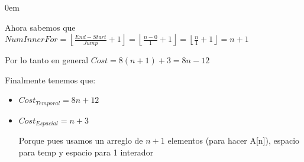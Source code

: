 \documentclass[12pt, fleqn]{article}                            %
\newenvironment{SmallIndentation}[1][0.75em]                    %
        {\begin{adjustwidth}{#1}{}\begin{footnotesize}}             %
        {\end{footnotesize}\end{adjustwidth}}                       %
\theoremstyle{break}                                            %
\newcommand{\Floor}[1]{\left \lfloor #1 \right \rfloor}         %
\begin{document}
\begin{SmallIndentation}[0em]
\begin{enumerate}
                Ahora sabemos que 
                $NumInnerFor 
                    = \Floor{\frac{End - Start}{Jump} + 1}
                    = \Floor{\frac{n - 0}{1} + 1}
                    = \Floor{\frac{n}{1} + 1}
                    = n+1$

                Por lo tanto en general $Cost = 8(n+1)+3 = 8n - 12$

        \end{enumerate}

        Finalmente tenemos que:
        \begin{itemize}
            \item $Cost_{Temporal} = 8n + 12$
            \item $Cost_{Espacial} = n + 3$

                Porque pues usamos un arreglo de $n + 1$ elementos (para hacer A[n]), 
                espacio para temp y espacio para 1 interador
        \end{itemize}
            
    \end{SmallIndentation}




    \clearpage
\end{document}

